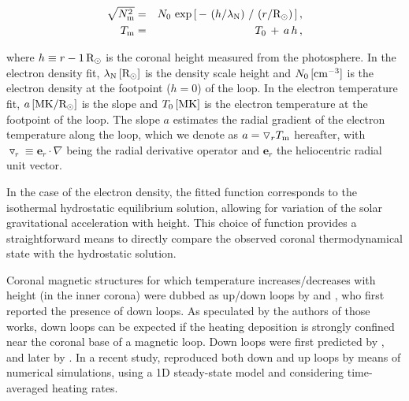 \documentclass[namedreferences]{solarphysics}
\renewcommand{\l}{\lambda_{\rm N}}%
\newcommand{\mrsun}{{\rm R_\odot}}
\newcommand{\MK}{{\rm MK}}
\newcommand{\cm}{{\rm cm}}
\newcommand{\cminvc}{\cm^{-3}}
\newcommand{\dr}{\triangledown_r}
\newcommand{\er}{\mathbf{e}_r}
\newcommand{\Tm}{T_{\rm m}}
\newcommand{\Nsqm}{N^2_{{\rm m}}}
\newcommand{\sqravgN}{\sqrt{\Nsqm}}
\begin{document}
\begin{article}
\begin{eqnarray}\label{Nfit}
\sqravgN &=& N_0\,\exp{\left[\,-\,\left(h/\l\right)\,/\,\left(r/\mrsun\right)\,\right]} \,,\\
\label{Tfit}
\Tm &=& T_0\,+\,a\,h\,,
\end{eqnarray}

\noindent
where $h \equiv r - 1\,\mrsun$ is the coronal height measured from the photosphere. In the electron density fit, $\l\,[\mrsun]$ is the density scale height and $N_0\,[\cminvc]$ is the electron density at the footpoint ($h=0$) of the loop. In the electron temperature fit, $a\,[\MK/\mrsun]$ is the slope and $T_0\,[\MK]$ is the electron temperature at the footpoint of the loop. The slope $a$ estimates the radial gradient of the electron temperature along the loop, which we denote as $a = \dr\Tm$ hereafter, {with} $\dr\equiv\er\cdot\nabla$ {being} the radial derivative operator {and} $\er$ the heliocentric radial unit vector.

In the case of the electron density, the fitted function corresponds to the isothermal hydrostatic equilibrium solution, allowing for variation of the solar gravitational acceleration with height. This choice of function provides a straightforward means to directly {compare the observed} coronal thermodynamical state with the hydrostatic solution.

{Coronal magnetic structures for which temperature increases/decreases with height (in the inner corona) were dubbed as up/down loops by \citet{huang_2012} and \citet{nuevo_2013}, who first reported the presence of down loops. As speculated by the authors of those works, down loops can be expected if the heating deposition is strongly confined near the coronal base of a magnetic loop. Down loops were first predicted by \citet{serio_1981}, and later by \citet{aschwanden_2002}. In a recent study, \citet{schiff_2016} reproduced both down and up loops by means of numerical simulations, using a 1D steady-state model and {considering time-averaged heating rates.}}


\end{article}
\end{document}
